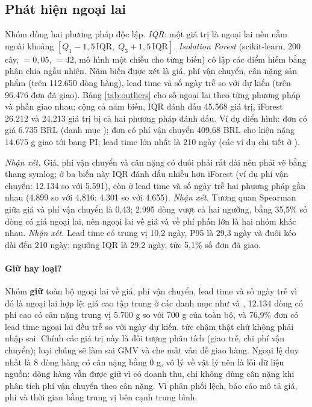 \subsection{Phát hiện ngoại lai}\label{sec:ngoai-lai}
Nhóm dùng hai phương pháp độc lập. \emph{IQR}: một giá trị là ngoại lai nếu nằm ngoài khoảng $[Q_1 - 1{,}5\,\mathrm{IQR},\; Q_3 + 1{,}5\,\mathrm{IQR}]$. \emph{Isolation Forest} (scikit-learn, 200 cây,  $= 0{,}05$,  $= 42$, mô hình một chiều cho từng biến) cô lập các điểm hiếm bằng phân chia ngẫu nhiên. Năm biến được xét là giá, phí vận chuyển, cân nặng sản phẩm (trên 112.650 dòng hàng), lead time và số ngày trễ so với dự kiến (trên 96.476 đơn đã giao). Bảng \ref{tab:outliers} cho số ngoại lai theo từng phương pháp và phần giao nhau; cộng cả năm biến, IQR đánh dấu 45.568 giá trị, iForest 26.212 và 24.213 giá trị bị cả hai phương pháp đánh dấu. Ví dụ điển hình: đơn  có giá 6.735 BRL (danh mục ); đơn  có phí vận chuyển 409,68 BRL cho kiện nặng 14.675 g giao tới bang PI; lead time lớn nhất là 210 ngày (các ví dụ chi tiết ở ).

\emph{Nhận xét.} Giá, phí vận chuyển và cân nặng có đuôi phải rất dài nên phải vẽ bằng thang symlog; ở ba biến này IQR đánh dấu nhiều hơn iForest (ví dụ phí vận chuyển: 12.134 so với 5.591), còn ở lead time và số ngày trễ hai phương pháp gần nhau (4.899 so với 4.816; 4.301 so với 4.655).
\emph{Nhận xét.} Tương quan Spearman giữa giá và phí vận chuyển là 0,43; 2.995 dòng vượt cả hai ngưỡng, bằng 35,5\% số dòng có giá ngoại lai, nên ngoại lai về giá và về phí phần lớn là hai nhóm khác nhau.
\emph{Nhận xét.} Lead time có trung vị 10,2 ngày, P95 là 29,3 ngày và đuôi kéo dài đến 210 ngày; ngưỡng IQR là 29,2 ngày, tức 5,1\% số đơn đã giao.
\paragraph{Giữ hay loại?} Nhóm \textbf{giữ} toàn bộ ngoại lai về giá, phí vận chuyển, lead time và số ngày trễ vì đó là ngoại lai hợp lệ: giá cao tập trung ở các danh mục như  và , 12.134 dòng có phí cao có cân nặng trung vị 5.700 g so với 700 g của toàn bộ, và 76,9\% đơn có lead time ngoại lai đều trễ so với ngày dự kiến, tức chậm thật chứ không phải nhập sai. Chính các giá trị này là đối tượng phân tích (giao trễ, chi phí vận chuyển); loại chúng sẽ làm sai GMV và che mất vấn đề giao hàng. Ngoại lệ duy nhất là 8 dòng hàng có cân nặng bằng 0 g, vô lý về vật lý nên là lỗi dữ liệu nguồn: dòng hàng vẫn được giữ vì có doanh thu, chỉ không dùng cân nặng khi phân tích phí vận chuyển theo cân nặng. Vì phân phối lệch, báo cáo mô tả giá, phí và thời gian bằng trung vị bên cạnh trung bình.


